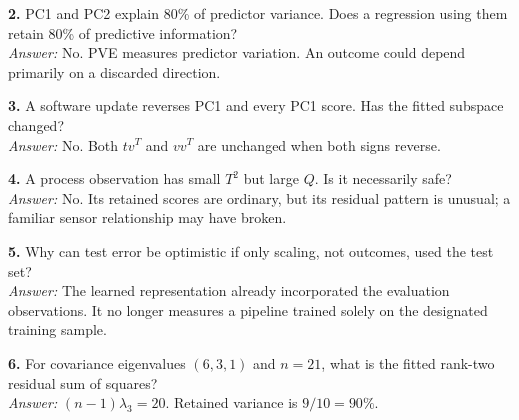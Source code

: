 \documentclass[11pt]{article}
\begin{document}
\textbf{2.} PC1 and PC2 explain 80\% of predictor variance. Does a regression using them retain 80\% of predictive information?\\
\emph{Answer:} No. PVE measures predictor variation. An outcome could depend primarily on a discarded direction.

\textbf{3.} A software update reverses PC1 and every PC1 score. Has the fitted subspace changed?\\
\emph{Answer:} No. Both $tv^T$ and $vv^T$ are unchanged when both signs reverse.

\textbf{4.} A process observation has small $T^2$ but large $Q$. Is it necessarily safe?\\
\emph{Answer:} No. Its retained scores are ordinary, but its residual pattern is unusual; a familiar sensor relationship may have broken.

\textbf{5.} Why can test error be optimistic if only scaling, not outcomes, used the test set?\\
\emph{Answer:} The learned representation already incorporated the evaluation observations. It no longer measures a pipeline trained solely on the designated training sample.

\textbf{6.} For covariance eigenvalues $(6,3,1)$ and $n=21$, what is the fitted rank-two residual sum of squares?\\
\emph{Answer:} $(n-1)\lambda_3=20$. Retained variance is $9/10=90\%$.
\end{document}
